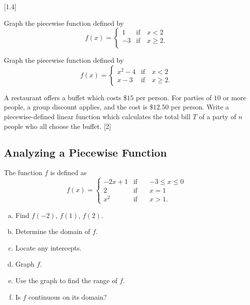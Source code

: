 \documentclass[oneside,10pt]{book}
\begin{document}
[1.4]

\vfill



\example
Graph the piecewise function defined by
  \[f(x) = \left\{
      \begin{array}{lr}%
        1 & \text{if} \quad  x < 2 \\
         - 3 & \text{if} \quad  x \geq 2. \\
      \end{array}
    \right.
  \]

\vfill



\newpage


\example
Graph the piecewise function defined by
  \[f(x) = \left\{
      \begin{array}{lr}%
        x^2-4 & \text{if} \quad  x < 2 \\
        x - 3 & \text{if} \quad  x \geq 2.
      \end{array}
    \right.
  \]
  \vfill




\example
A restaurant offers a buffet which costs $\$15$ per person.  For parties of $10$ or more people, a group discount applies, and the cost is $\$12.50$ per person.   Write a piecewise-defined linear function which calculates the total bill $T$ of a party of $n$ people who all choose the buffet.
\vfill[2]


\subsection{Analyzing a Piecewise Function}

\example
The function $f$ is defined as
\[f(x) =
  \left\{
      \begin{array}{lrl}%
        -2x + 1   & \text{if} \quad &  -3 \leq x \leq 0 \\
         2        & \text{if} \quad &   x = 1 \\
         x^2      & \text{if} \quad &   x > 1.
      \end{array}
    \right.
  \]
  \begin{enumerate}[a.]
      \item
        Find $f(-2)$, $f(1)$, $f(2)$.
      \item
        Determine the domain of $f$.
      \item
        Locate any intercepts.
      \item
        Graph  $f$.
      \item
        Use the graph to find the range of $f$.
      \item
          Is $f$ continuous on its domain?
  \end{enumerate}
\end{document}
